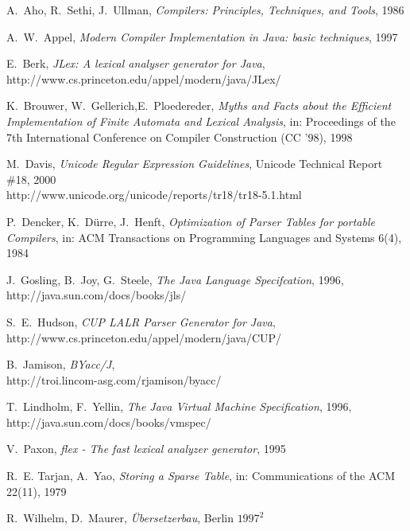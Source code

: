 \documentclass[11pt]{scrartcl}
\newcommand{\trit}{\em}
\begin{document}
\newpage  
\begin{thebibliography}{[00]} 
\label{References} 

  A.~Aho, R.~Sethi, J.~Ullman, {\trit Compilers: Principles, Techniques, and Tools}, 1986


  A.~W.~Appel, {\trit Modern Compiler Implementation in Java: basic techniques}, 1997

 E.~Berk, {\trit JLex: A lexical analyser generator for Java},\\
                   {http://www.cs.princeton.edu/appel/modern/java/JLex/}


  K.~Brouwer, W.~Gellerich,E.~Ploedereder, 
  {\trit Myths and Facts about the Efficient Implementation of Finite Automata and Lexical Analysis}, 
  in: Proceedings of the 7th International Conference on Compiler Construction (CC '98), 1998

  M.~Davis, {\trit Unicode Regular Expression Guidelines}, Unicode Technical Report \#18, 2000\\ 
                    {http://www.unicode.org/unicode/reports/tr18/tr18-5.1.html}

 P.~Dencker, K.~D{\"u}rre, J.~Henft, {\trit Optimization of Parser Tables for portable Compilers}, 
 in: ACM Transactions on Programming Languages and Systems 6(4), 1984

  J.~Gosling, B.~Joy, G.~Steele, {\trit The Java Language Specifcation}, 1996,\\
                    {http://java.sun.com/docs/books/jls/}

  S.~E.~Hudson, {\trit CUP LALR Parser Generator for Java},\\  
  {http://www.cs.princeton.edu/appel/modern/java/CUP/}

  B.~Jamison, {\trit BYacc/J},\\
  {http://troi.lincom-asg.com/rjamison/byacc/}
  
 T.~Lindholm, F.~Yellin, {\trit The Java Virtual Machine Specification}, 1996,\\
                   {http://java.sun.com/docs/books/vmspec/}
 
 V.~Paxon, {\trit flex - The fast lexical analyzer generator}, 1995

  R.~E. Tarjan, A.~Yao, {\trit Storing a Sparse Table}, in: Communications of the ACM 22(11), 1979 

  R.~Wilhelm, D.~Maurer, {\trit {\"U}bersetzerbau}, Berlin $1997^2$

\end{thebibliography}
\end{document}
